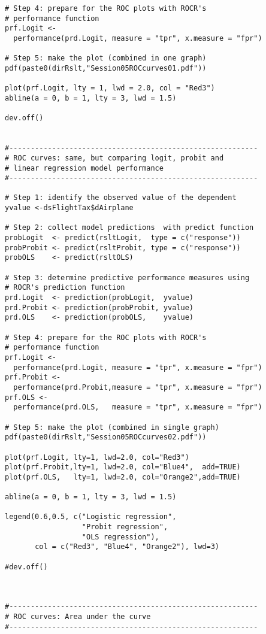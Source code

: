 \documentclass{article}
\begin{document}
\begin{tiny}
\begin{verbatim}
# Step 4: prepare for the ROC plots with ROCR's
# performance function
prf.Logit <- 
  performance(prd.Logit, measure = "tpr", x.measure = "fpr")

# Step 5: make the plot (combined in one graph)
pdf(paste0(dirRslt,"Session05ROCcurves01.pdf"))

plot(prf.Logit, lty = 1, lwd = 2.0, col = "Red3")
abline(a = 0, b = 1, lty = 3, lwd = 1.5)

dev.off()


#----------------------------------------------------------
# ROC curves: same, but comparing logit, probit and 
# linear regression model performance
#----------------------------------------------------------

# Step 1: identify the observed value of the dependent
yvalue <-dsFlightTax$dAirplane

# Step 2: collect model predictions  with predict function
probLogit  <- predict(rsltLogit,  type = c("response"))
probProbit <- predict(rsltProbit, type = c("response"))
probOLS    <- predict(rsltOLS)

# Step 3: determine predictive performance measures using
# ROCR's prediction function
prd.Logit  <- prediction(probLogit,  yvalue)
prd.Probit <- prediction(probProbit, yvalue)
prd.OLS    <- prediction(probOLS,    yvalue)

# Step 4: prepare for the ROC plots with ROCR's
# performance function
prf.Logit <- 
  performance(prd.Logit, measure = "tpr", x.measure = "fpr")
prf.Probit <- 
  performance(prd.Probit,measure = "tpr", x.measure = "fpr")
prf.OLS <- 
  performance(prd.OLS,   measure = "tpr", x.measure = "fpr")

# Step 5: make the plot (combined in single graph)
pdf(paste0(dirRslt,"Session05ROCcurves02.pdf"))

plot(prf.Logit, lty=1, lwd=2.0, col="Red3")
plot(prf.Probit,lty=1, lwd=2.0, col="Blue4",  add=TRUE)
plot(prf.OLS,   lty=1, lwd=2.0, col="Orange2",add=TRUE)

abline(a = 0, b = 1, lty = 3, lwd = 1.5)

legend(0.6,0.5, c("Logistic regression",
                  "Probit regression", 
                  "OLS regression"),
       col = c("Red3", "Blue4", "Orange2"), lwd=3)

#dev.off()



#----------------------------------------------------------
# ROC curves: Area under the curve
#----------------------------------------------------------


\end{verbatim}
\end{tiny}
\end{document}

